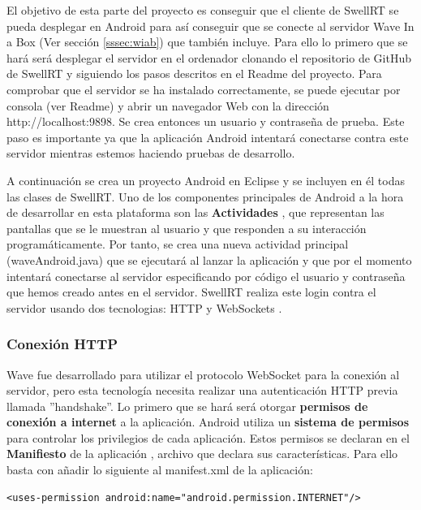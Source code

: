 	El objetivo de esta parte del proyecto es conseguir que el cliente de SwellRT se pueda desplegar en Android para así conseguir que se conecte al servidor Wave In a Box (Ver sección \ref{sssec:wiab}) que también incluye. Para ello lo primero que se hará será desplegar el servidor en el ordenador clonando el repositorio de GitHub \cite{ref:swellRT_github} de SwellRT y siguiendo los pasos descritos en el Readme del proyecto. Para comprobar que el servidor se ha instalado correctamente, se puede ejecutar por consola (ver Readme) y abrir un navegador Web con la dirección http://localhost:9898. Se crea entonces un usuario y contraseña de prueba. Este paso es importante ya que la aplicación Android intentará conectarse contra este servidor mientras estemos haciendo pruebas de desarrollo. 
	  
	  A continuación se crea un proyecto Android en Eclipse y se incluyen en él todas las clases de SwellRT. Uno de los componentes principales de Android a la hora de desarrollar en esta plataforma son las \textbf{Actividades} \cite{ref:android_activities}, que representan las pantallas que se le muestran al usuario y que responden a su interacción programáticamente. Por tanto, se crea una nueva actividad  principal (waveAndroid.java) que se ejecutará al lanzar la aplicación y que por el momento intentará conectarse al servidor especificando por código el usuario y contraseña que hemos creado antes en el servidor. SwellRT realiza este login contra el servidor usando dos tecnologias: HTTP \cite{ref:http_authentication} y WebSockets \cite{ref:webSocket_ref}.
	  
  
    		\subsubsection{Conexión HTTP}\label{sssec:conHttp}
	
	Wave fue desarrollado para utilizar el protocolo WebSocket para la conexión al servidor, pero esta tecnología necesita realizar una autenticación HTTP previa llamada ''handshake''. Lo primero que se hará será otorgar \textbf{permisos de conexión a internet} a la aplicación. Android utiliza un \textbf{sistema de permisos} \cite{ref:android_permissions} para controlar los privilegios de cada aplicación. Estos permisos se declaran en el \textbf{Manifiesto} de la aplicación \cite{ref:android_manifest}, archivo que declara sus características. Para ello basta con añadir lo siguiente al manifest.xml de la aplicación:
	  
	  \lstset{language=XML, breaklines=true, autogobble=true, basicstyle=\ttfamily\footnotesize}
	  \begin{lstlisting}[frame=single]
	  	<uses-permission android:name="android.permission.INTERNET"/>
	  \end{lstlisting}
	  
